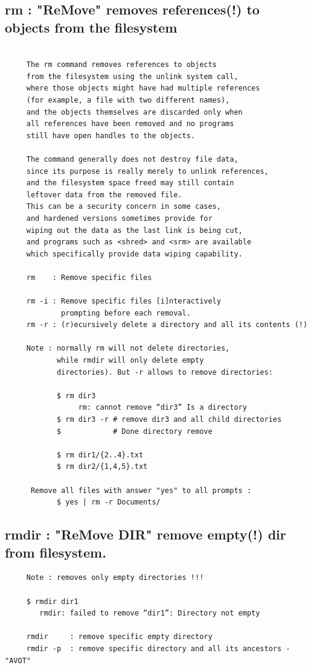 \documentclass[a4paper,12pt]{article}
\begin{document}
\subsection{rm       : "ReMove" removes references(!) to objects from the filesystem}
\begin{verbatim}
     
     The rm command removes references to objects 
     from the filesystem using the unlink system call,
     where those objects might have had multiple references
     (for example, a file with two different names), 
     and the objects themselves are discarded only when 
     all references have been removed and no programs 
     still have open handles to the objects.
   
     The command generally does not destroy file data,
     since its purpose is really merely to unlink references,
     and the filesystem space freed may still contain 
     leftover data from the removed file.
     This can be a security concern in some cases, 
     and hardened versions sometimes provide for 
     wiping out the data as the last link is being cut, 
     and programs such as <shred> and <srm> are available
     which specifically provide data wiping capability.
     
     rm    : Remove specific files
     
     rm -i : Remove specific files [i]nteractively 
             prompting before each removal.
     rm -r : (r)ecursively delete a directory and all its contents (!) 
     
     Note : normally rm will not delete directories, 
            while rmdir will only delete empty
            directories). But -r allows to remove directories:
            
            $ rm dir3
                 rm: cannot remove “dir3” Is a directory
            $ rm dir3 -r # remove dir3 and all child directories
            $            # Done directory remove
            
            $ rm dir1/{2..4}.txt
            ﻿$ rm dir2/{1,4,5}.txt
      
      Remove all files with answer "yes" to all prompts : 
            $ yes | rm -r Documents/      

\end{verbatim}

\subsection{rmdir    : "ReMove DIR" remove empty(!) dir from filesystem.}
\begin{verbatim}
     Note : removes only empty directories !!!
     
     $ rmdir dir1
        rmdir: failed to remove “dir1”: Directory not empty

     rmdir     : remove specific empty directory
     rmdir -p  : remove specific directory and all its ancestors - "AVOT" 
\end{verbatim}
\end{document}
